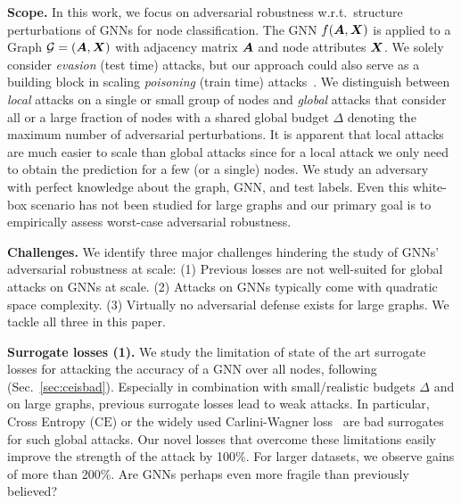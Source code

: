\documentclass[sigconf, review]{acmart}
\newcommand{\adj}{\mA}
\newcommand{\features}{\mX}
\begin{document}
\textbf{Scope.} In this work, we focus on adversarial robustness w.r.t.\ structure perturbations of GNNs for node classification. The GNN \(f(\adj, \features)\) is applied to a Graph \(\gG=(\adj, \features)\) with adjacency matrix \(\adj\) and node attributes \(\features\).
We solely consider \emph{evasion} (test time) attacks, but our approach could also serve as a building block in scaling \emph{poisoning} (train time) attacks~\cite{Zugner2019a}. We distinguish between \emph{local} attacks on a single or small group of nodes and \emph{global} attacks that consider all or a large fraction of nodes with a shared global budget \(\Delta\) denoting the maximum number of adversarial perturbations. It is apparent that local attacks are much easier to scale than global attacks since for a local attack we only need to obtain the prediction for a few (or a single) nodes. We study an adversary with perfect knowledge about the graph, GNN, and test labels. Even this white-box scenario has not been studied for large graphs and our primary goal is to empirically assess worst-case adversarial robustness.

\textbf{Challenges.} We identify three major challenges hindering the study of GNNs' adversarial robustness at scale: (1) Previous losses are not well-suited for global attacks on GNNs at scale. (2) Attacks on GNNs typically come with quadratic space complexity. (3) Virtually no adversarial defense exists for large graphs. We tackle all three in this paper.

\textbf{Surrogate losses (1).} We study the limitation of state of the art surrogate losses for attacking the accuracy of a GNN over all nodes, following~\citep{Chen2018, Wu2019, Xu2018, Zugner2019a} (Sec.~\ref{sec:ceisbad}). Especially in combination with small/realistic budgets \(\Delta\) and on large graphs, previous surrogate losses lead to weak attacks. In particular, Cross Entropy (\(\text{CE}\)) or the widely used Carlini-Wagner loss~\citep{Carlini2017} are bad surrogates for such global attacks. Our novel losses that overcome these limitations easily improve the strength of the attack by 100\%. For larger datasets, we observe gains of more than 200\%. Are GNNs perhaps even more fragile than previously believed?
\end{document}
